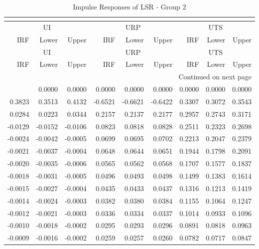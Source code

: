 \begin{longtable}{rrrrrrrrr}
\caption{Impulse Responses of LSR - Group 2}\\
\label{tab:lsr_irf_group2}\\
\toprule
\multicolumn{3}{c}{UI} & \multicolumn{3}{c}{URP} & \multicolumn{3}{c}{UTS} \\
IRF & Lower & Upper & IRF & Lower & Upper & IRF & Lower & Upper \\
\midrule
\endfirsthead
\toprule
\multicolumn{3}{c}{UI} & \multicolumn{3}{c}{URP} & \multicolumn{3}{c}{UTS} \\
IRF & Lower & Upper & IRF & Lower & Upper & IRF & Lower & Upper \\
\midrule
\endhead
\midrule
\multicolumn{9}{r}{Continued on next page} \\
\midrule
\endfoot
\bottomrule
\endlastfoot
0.0000 & 0.0000 & 0.0000 & 0.0000 & 0.0000 & 0.0000 & 0.0000 & 0.0000 & 0.0000 \\
0.3823 & 0.3513 & 0.4132 & -0.6521 & -0.6621 & -0.6422 & 0.3307 & 0.3072 & 0.3543 \\
0.0284 & 0.0223 & 0.0344 & 0.2157 & 0.2137 & 0.2177 & 0.2957 & 0.2743 & 0.3171 \\
-0.0129 & -0.0152 & -0.0106 & 0.0823 & 0.0818 & 0.0828 & 0.2511 & 0.2323 & 0.2698 \\
-0.0024 & -0.0042 & -0.0005 & 0.0699 & 0.0695 & 0.0702 & 0.2213 & 0.2047 & 0.2379 \\
-0.0021 & -0.0037 & -0.0004 & 0.0648 & 0.0644 & 0.0651 & 0.1944 & 0.1798 & 0.2091 \\
-0.0020 & -0.0035 & -0.0006 & 0.0565 & 0.0562 & 0.0568 & 0.1707 & 0.1577 & 0.1837 \\
-0.0018 & -0.0031 & -0.0005 & 0.0496 & 0.0493 & 0.0498 & 0.1499 & 0.1383 & 0.1614 \\
-0.0015 & -0.0027 & -0.0004 & 0.0435 & 0.0433 & 0.0437 & 0.1316 & 0.1213 & 0.1419 \\
-0.0014 & -0.0024 & -0.0003 & 0.0382 & 0.0380 & 0.0384 & 0.1155 & 0.1064 & 0.1247 \\
-0.0012 & -0.0021 & -0.0003 & 0.0336 & 0.0334 & 0.0337 & 0.1014 & 0.0933 & 0.1096 \\
-0.0010 & -0.0018 & -0.0002 & 0.0295 & 0.0293 & 0.0296 & 0.0891 & 0.0818 & 0.0963 \\
-0.0009 & -0.0016 & -0.0002 & 0.0259 & 0.0257 & 0.0260 & 0.0782 & 0.0717 & 0.0847 \\
\end{longtable}